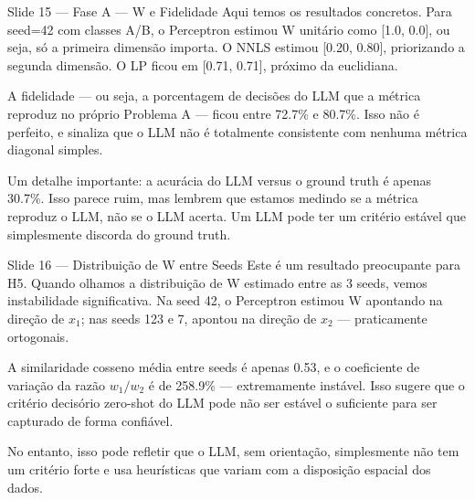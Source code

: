 \documentclass[aspectratio=169,11pt]{beamer}
\begin{document}
\begin{frame}{Slide 15 --- Fase A --- W e Fidelidade}
\small
Aqui temos os resultados concretos. Para seed=42 com classes A/B, o Perceptron estimou W unitário como [1.0, 0.0], ou seja, só a primeira dimensão importa. O NNLS estimou [0.20, 0.80], priorizando a segunda dimensão. O LP ficou em [0.71, 0.71], próximo da euclidiana.

A fidelidade --- ou seja, a porcentagem de decisões do LLM que a métrica reproduz no próprio Problema A --- ficou entre 72.7\% e 80.7\%. Isso não é perfeito, e sinaliza que o LLM não é totalmente consistente com nenhuma métrica diagonal simples.

Um detalhe importante: a acurácia do LLM versus o ground truth é apenas 30.7\%. Isso parece ruim, mas lembrem que estamos medindo se a métrica reproduz o LLM, não se o LLM acerta. Um LLM pode ter um critério estável que simplesmente discorda do ground truth.
\end{frame}

\begin{frame}{Slide 16 --- Distribuição de W entre Seeds}
\small
Este é um resultado preocupante para H5. Quando olhamos a distribuição de W estimado entre as 3 seeds, vemos instabilidade significativa. Na seed 42, o Perceptron estimou W apontando na direção de $x_1$; nas seeds 123 e 7, apontou na direção de $x_2$ --- praticamente ortogonais.

A similaridade cosseno média entre seeds é apenas 0.53, e o coeficiente de variação da razão $w_1/w_2$ é de 258.9\% --- extremamente instável. Isso sugere que o critério decisório zero-shot do LLM pode não ser estável o suficiente para ser capturado de forma confiável.

No entanto, isso pode refletir que o LLM, sem orientação, simplesmente não tem um critério forte e usa heurísticas que variam com a disposição espacial dos dados.
\end{frame}
\end{document}
